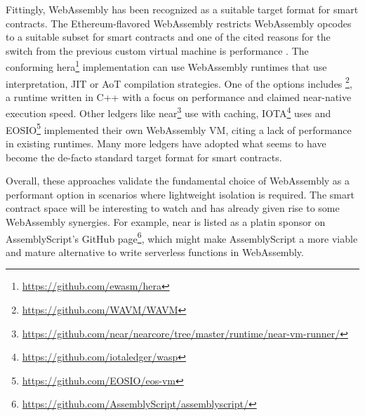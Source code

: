 Fittingly, WebAssembly has been recognized as a suitable target format for smart contracts. The Ethereum-flavored WebAssembly restricts WebAssembly opcodes to a suitable subset for smart contracts and one of the cited reasons for the switch from the previous custom virtual machine is performance \cite{Ewasm2021}.
The conforming hera\footnote{\url{https://github.com/ewasm/hera}} implementation can use WebAssembly runtimes that use interpretation, JIT or AoT compilation strategies. One of the options includes \footnote{\url{https://github.com/WAVM/WAVM}}, a runtime written in C++ with a focus on performance and claimed near-native execution speed.
Other ledgers like near\footnote{\url{https://github.com/near/nearcore/tree/master/runtime/near-vm-runner/}} use  with caching, IOTA\footnote{\url{https://github.com/iotaledger/wasp}} uses  and EOSIO\footnote{\url{https://github.com/EOSIO/eos-vm}} implemented their own WebAssembly VM, citing a lack of performance in existing runtimes. Many more ledgers have adopted what seems to have become the de-facto standard target format for smart contracts.

Overall, these approaches validate the fundamental choice of WebAssembly as a performant option in scenarios where lightweight isolation is required. The smart contract space will be interesting to watch and has already given rise to some WebAssembly synergies. For example, near is listed as a platin sponsor on AssemblyScript's GitHub page\footnote{\url{https://github.com/AssemblyScript/assemblyscript/}}, which might make AssemblyScript a more viable and mature alternative to write serverless functions in WebAssembly.
